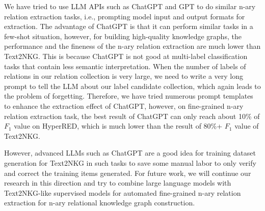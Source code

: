 \documentclass{article} \usepackage{iclr2024_conference,times}
\begin{document}
We have tried to use LLM APIs such as ChatGPT and GPT to do similar n-ary relation extraction tasks, i.e., prompting model input and output formats for extraction. The advantage of ChatGPT is that it can perform similar tasks in a few-shot situation, however, for building high-quality knowledge graphs, the performance and the fineness of the n-ary relation extraction are much lower than Text2NKG. This is because ChatGPT is not good at multi-label classification tasks that contain less semantic interpretation. When the number of labels of relations in our relation collection is very large, we need to write a very long prompt to tell the LLM about our label candidate collection, which again leads to the problem of forgetting. Therefore, we have tried numerous prompt templates to enhance the extraction effect of ChatGPT, however, on fine-grained n-ary relation extraction task, the best result of ChatGPT can only reach about 10\% of $F_1$ value on HyperRED, which is much lower than the result of 80\%+ $F_1$ value of Text2NKG. 

However, advanced LLMs such as ChatGPT are a good idea for training dataset generation for Text2NKG in such tasks to save some manual labor to only verify and correct the training items generated. For future work, we will continue our research in this direction and try to combine large language models with Text2NKG-like supervised models for automated fine-grained n-ary relation extraction for n-ary relational knowledge graph construction.
\end{document}
